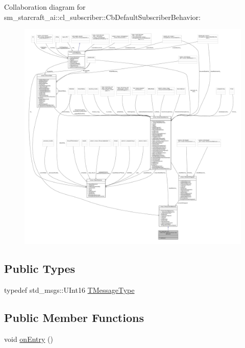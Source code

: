 Collaboration diagram for sm\+\_\+starcraft\+\_\+ai\+:\+:cl\+\_\+subscriber\+:\+:Cb\+Default\+Subscriber\+Behavior\+:
\nopagebreak
\begin{figure}[H]
\begin{center}
\leavevmode
\includegraphics[width=350pt]{classsm__starcraft__ai_1_1cl__subscriber_1_1CbDefaultSubscriberBehavior__coll__graph}
\end{center}
\end{figure}
\subsection*{Public Types}
\begin{DoxyCompactItemize}
\item 
typedef std\+\_\+msgs\+::\+U\+Int16 \hyperlink{classsm__starcraft__ai_1_1cl__subscriber_1_1CbDefaultSubscriberBehavior_ab02c0a0b9d284c21ab52d4d840787ab2}{T\+Message\+Type}
\end{DoxyCompactItemize}
\subsection*{Public Member Functions}
\begin{DoxyCompactItemize}
\item 
void \hyperlink{classsm__starcraft__ai_1_1cl__subscriber_1_1CbDefaultSubscriberBehavior_af8cd24389471af7133f258839f899932}{on\+Entry} ()
\end{DoxyCompactItemize}


